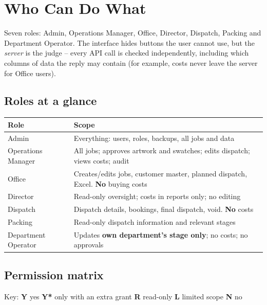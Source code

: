 \section{Who Can Do What}\label{sec:permissions}

\begin{plainwords}
Seven roles: Admin, Operations Manager, Office, Director, Dispatch, Packing and
Department Operator. The interface hides buttons the user cannot use, but the \emph{server}
is the judge -- every API call is checked independently, including which columns of data
the reply may contain (for example, costs never leave the server for Office users).
\end{plainwords}

\subsection*{Roles at a glance}

\begin{tabularx}{\textwidth}{@{}l X@{}}
\toprule
\textbf{Role} & \textbf{Scope} \\
\midrule
Admin & Everything: users, roles, backups, all jobs and data \\
Operations Manager & All jobs; approves artwork and swatches; edits dispatch; views
  costs; audit \\
Office & Creates/edits jobs, customer master, planned dispatch, Excel. \textbf{No}
  buying costs \\
Director & Read-only oversight; costs in reports only; no editing \\
Dispatch & Dispatch details, bookings, final dispatch, void. \textbf{No} costs \\
Packing & Read-only dispatch information and relevant stages \\
Department Operator & Updates \textbf{own department's stage only}; no costs; no
  approvals \\
\bottomrule
\end{tabularx}

\subsection*{Permission matrix}

Key: \textbf{Y} yes \quad \textbf{Y*} only with an extra grant \quad \textbf{R}
read-only \quad \textbf{L} limited scope \quad \textbf{N} no

